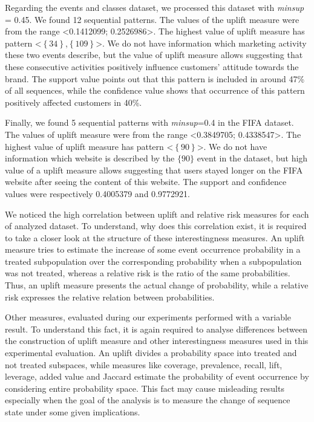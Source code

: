 \documentclass[runningheads,a4paper]{llncs}
\begin{document}
Regarding the events and classes dataset, we processed this dataset with \textit{minsup} = 0.45. We found 12 sequential patterns. The values of the uplift measure were from the range \textless 0.1412099; 0.2526986\textgreater. The highest value of uplift measure has pattern \textless$\left\{\text{34}\right\}$,$\left\{\text{109}\right\}$\textgreater. We do not have information which marketing activity these two events describe, but the value of uplift measure allows suggesting that these consecutive activities positively influence customers’ attitude towards the brand. The support value points out that this pattern is included in around 47\% of all sequences, while the confidence value shows that occurrence of this pattern positively affected customers in 40\%.

Finally, we found 5 sequential patterns with \textit{minsup}=0.4 in the FIFA dataset. The values of uplift measure were from the range \textless 0.3849705; 0.4338547\textgreater. The highest value of uplift measure has pattern \textless$\left\{\text{90}\right\}$\textgreater. We do not have information which website is described by the $\{\text{90}\}$ event in the dataset, but high value of a uplift measure allows suggesting that users stayed longer on the FIFA website after seeing the content of this website. The support and confidence values were respectively 0.4005379 and 0.9772921.

We noticed the high correlation between uplift and relative risk measures for each of analyzed dataset. To understand, why does this correlation exist, it is required to take a closer look at the structure of these interestingness measures. An uplift measure tries to estimate the increase of some event occurrence probability in a treated subpopulation over the corresponding probability when a subpopulation was not treated, whereas a relative risk is the ratio of the same probabilities. Thus, an uplift measure presents the actual change of probability, while a relative risk expresses the relative relation between probabilities.

Other measures, evaluated during our experiments performed with a variable result. To understand this fact, it is again required to analyse differences between the construction of uplift measure and other interestingness measures used in this experimental evaluation.
An uplift divides a probability space into treated and not treated subspaces, while measures like coverage, prevalence, recall, lift, leverage, added value and Jaccard estimate the probability of event occurrence by considering entire probability space.
This fact may cause misleading results especially when the goal of the analysis is to measure the change of sequence state under some given implications.
\end{document}
